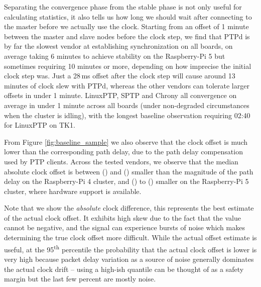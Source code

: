 Separating the convergence phase from the stable phase is not only useful for calculating statistics, it also tells us how long we should wait after connecting to the master before we actually use the clock. Starting from an offset of 1 minute between the master and slave nodes before the clock step, we find that PTPd is by far the slowest vendor at establishing synchronization on all boards, on average taking 6 minutes to achieve stability on the Raspberry-Pi 5 but sometimes requiring 10 minutes or more, depending on how imprecise the initial clock step was. Just a 28\,ms offset after the clock step will cause around 13 minutes of clock slew with PTPd, whereas the other vendors can tolerate larger offsets in under 1 minute. LinuxPTP, SPTP and Chrony all convergence on average in under 1 minute across all boards (under non-degraded circumstances when the cluster is idling), with the longest baseline observation requiring 02:40 for LinuxPTP on TK1.

From Figure \ref{fig:baseline_sample} we also observe that the clock offset is much lower than the corresponding path delay, due to the path delay compensation used by PTP clients. Across the tested vendors, we observe that the median absolute clock offset is between \fRatio{\cmpMin} (\fVendor{\cmpMinArg}) and \fRatio{\cmpMax} (\fVendor{\cmpMaxArg}) smaller than the magnitude of the path delay on the Raspberry-Pi 4 cluster,%
%
and \fRatio[-1]{\cmpMin} (\fVendor{\cmpMinArg}) to \fRatio[-1]{\cmpMax} (\fVendor{\cmpMaxArg}) smaller on the Raspberry-Pi 5 cluster, where hardware support is available.

Note that we show the \emph{absolute} clock difference, this represents the best estimate of the actual clock offset. It exhibits high skew due to the fact that the value cannot be negative, and the signal can experience bursts of noise which makes determining the true clock offset more difficult. While the actual offset estimate is useful, at the 95\textsuperscript{th} percentile the probability that the actual clock offset is lower is very high because packet delay variation as a source of noise generally dominates the actual clock drift -- using a high-ish quantile can be thought of as a safety margin but the last few percent are mostly noise.

